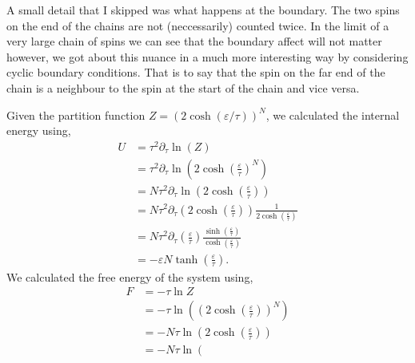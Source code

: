 \documentclass[a4paper]{article}
\begin{document}
\begin{multicols}{2}
        A small detail that I skipped was what happens at the boundary. %
        The two spins on the end of the chains are not (neccessarily) %
        counted twice. In the limit of a very large chain of spins we %
        can see that the boundary affect will not matter however, we %
        got about this nuance in a much more interesting way by considering %
        cyclic boundary conditions. That is to say that the spin on the %
        far end of the chain is a neighbour to the spin at the start of the %
        chain and vice versa. 


        Given the partition function \(Z = (2\cosh(\varepsilon / \tau))^{N}\), we 
        calculated the internal energy using,
        \begin{align}
            U &= \tau^{2}\partial_{\tau}\ln(Z)\label{EQN1}\\
                &= \tau^{2}\partial_{\tau}
                    \ln\left(2\cosh\left(\frac{\varepsilon}{\tau}\right)^{N}\right)
                    \nonumber \\
                &= N\tau^{2}\partial_{\tau}
                    \ln\left(2\cosh\left(\frac{\varepsilon}{\tau}\right)\right)
                    \nonumber \\
                &= N\tau^{2}\partial_{\tau}
                    \left(2\cosh\left(\frac{\varepsilon}{\tau}\right)\right)
                    \frac{1}{2\cosh\left(\frac{\varepsilon}{\tau}\right)}
                    \nonumber \\
                &= N\tau^{2}\partial_{\tau}\left(\frac{\varepsilon}{\tau}\right)
                    \frac{\sinh\left(\frac{\varepsilon}{\tau}\right)}
                    {\cosh\left(\frac{\varepsilon}{\tau}\right)}\nonumber \\
                &= -\varepsilon N\tanh\left(\frac{\varepsilon}{\tau}\right)
                    \label{eqn:10}.
        \end{align}
        We calculated the free energy of the system using,
        \begin{align}
            F &= -\tau\ln Z \\
                &= -\tau\ln\left(\left(
                    2\cosh\left(\frac{\varepsilon}{\tau}\right)\right)^{N}\right) 
                    \nonumber \\
                &= -N\tau\ln\left(
                    2\cosh\left(\frac{\varepsilon}{\tau}\right)\right) 
                    \nonumber \\
                &= -N\tau\ln\left(

\end{align}
\end{multicols}
\end{document}

